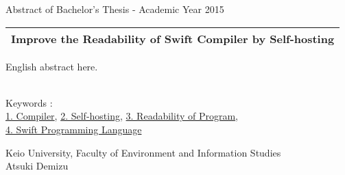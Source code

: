 Abstract of Bachelor's Thesis - Academic Year 2015
\begin{center}
\begin{Large}
\begin{tabular}{|c|} \hline
Improve the Readability of Swift Compiler by Self-hosting
\\
\hline
\end{tabular}
\end{Large}
\end{center}

English abstract here.

~ \\
Keywords : \\
\underline{1. Compiler},
\underline{2. Self-hosting},
\underline{3. Readability of Program},\\
\underline{4. Swift Programming Language}
\begin{flushright}
Keio University, Faculty of Environment and Information Studies\\
Atsuki Demizu
\end{flushright}
